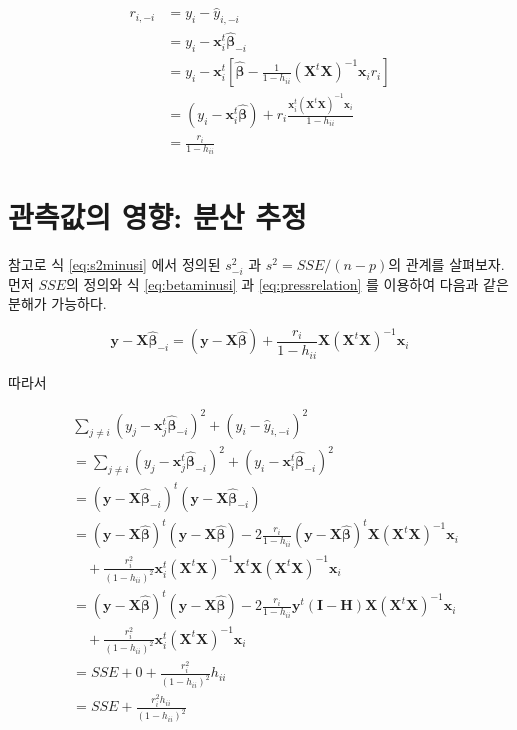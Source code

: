 \documentclass[
  10pt,
]{book}
\theoremstyle{definition}
\theoremstyle{definition}
\theoremstyle{definition}
\theoremstyle{definition}
\theoremstyle{remark}
\begin{document}
\begin{align}
r_{i,-i} & =   y_i - \hat y_{i,-i} \\
 & =y_i - \bm x^t_i \hat{ \bm \beta}_{-i}  \\
& = y_i - \bm x^t_i  \left [ \hat{ \bm \beta} - \frac{1}{1-h_{ii}} (\bm X^t \bm X)^{-1}  \bm x_i r_i \right ] \\
&= (y_i - \bm x^t_i \hat{ \bm \beta}) +   r_i  \frac{\bm x^t_i (\bm X^t \bm X)^{-1}  \bm x_i}{1-h_{ii}} \\
&= \frac{r_i}{1-h_{ii}}
\label{eq:pressrelation}
\end{align}

\hypertarget{uxad00uxce21uxac12uxc758-uxc601uxd5a5-uxbd84uxc0b0-uxcd94uxc815}{%
\section{관측값의 영향: 분산 추정}\label{uxad00uxce21uxac12uxc758-uxc601uxd5a5-uxbd84uxc0b0-uxcd94uxc815}}

참고로 식 \eqref{eq:s2minusi} 에서 정의된 \(s^2_{-i}\) 과
\(s^2 = SSE/(n-p)\)의 관계를 살펴보자. 먼저 \(SSE\)의 정의와 식
\eqref{eq:betaminusi} 과 \eqref{eq:pressrelation} 를 이용하여 다음과 같은
분해가 가능하다.

\[ 
\bm y - {\bm X} \hat{ \bm \beta}_{-i}  = ( \bm y - {\bm X} \hat{ \bm \beta}) + 
\frac{r_i}{1-h_{ii}} \bm X (\bm X^t \bm X)^{-1}  \bm x_i 
\]

따라서

\begin{align}
& \sum_{j \ne i} (y_j - {\bm x}_j^t \hat{ \bm \beta}_{-i} )^2   + (y_i - \hat {y}_{i,-i} )^2 \\
 & = \sum_{j \ne i} (y_j - {\bm x}_j^t \hat{ \bm \beta}_{-i} )^2   + (y_i - {\bm x}_i^t \hat{ \bm \beta}_{-i} )^2  \\
  & = ( \bm y - \bm X \hat {\bm \beta}_{-i})^t ( \bm y - \bm X \hat {\bm \beta}_{-i}) \\
  & = ( \bm y - \bm X \hat {\bm \beta})^t ( \bm y - \bm X \hat {\bm \beta})
   -2 \frac{r_i}{1-h_{ii}} ( \bm y - \bm X \hat {\bm \beta})^t  \bm X (\bm X^t \bm X)^{-1}  \bm x_i  \\
   & \quad + \frac{r^2_i}{(1-h_{ii})^2} \bm x_i^t  (\bm X^t \bm X)^{-1} \bm X^t \bm X (\bm X^t \bm X)^{-1}  \bm x_i  \\
   & = ( \bm y - \bm X \hat {\bm \beta})^t ( \bm y - \bm X \hat {\bm \beta})
   -2 \frac{r_i}{1-h_{ii}}  \bm y^t(\bm I - \bm H)  \bm X (\bm X^t \bm X)^{-1}  \bm x_i  \\
   & \quad  + \frac{r^2_i}{(1-h_{ii})^2} \bm x_i^t (\bm X^t \bm X)^{-1}  \bm x_i  \\
    & = SSE + 0 + \frac{r^2_i}{(1-h_{ii})^2} h_{ii}  \\
    & = SSE  + \frac{r^2_i h_{ii}}{(1-h_{ii})^2}   
\label{eq:sseminusi}
\end{align}
\end{document}
